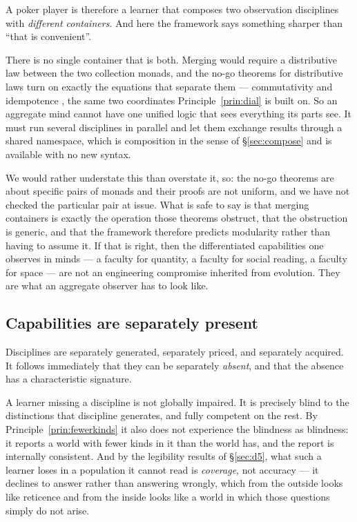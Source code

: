 A poker player is therefore a learner that composes two observation disciplines
with \emph{different containers}. And here the framework says something sharper
than ``that is convenient''.

\begin{observation}
\label{obs:nomerge}
There is no single container that is both. Merging would require a distributive
law between the two collection monads, and the no-go theorems for distributive
laws turn on exactly the equations that separate them --- commutativity and
idempotence \cite{ZwartMarsden19}, the same two coordinates
Principle~\ref{prin:dial} is built on. So an aggregate mind cannot have one
unified logic that sees everything its parts see. It must run several disciplines
in parallel and let them exchange results through a shared namespace, which is
composition in the sense of \S\ref{sec:compose} and is available with no new
syntax.
\end{observation}

We would rather understate this than overstate it, so: the no-go theorems are
about specific pairs of monads and their proofs are not uniform, and we have not
checked the particular pair at issue. What is safe to say is that merging
containers is exactly the operation those theorems obstruct, that the obstruction
is generic, and that the framework therefore predicts modularity rather than
having to assume it. If that is right, then the differentiated capabilities one
observes in minds --- a faculty for quantity, a faculty for social reading, a
faculty for space --- are not an engineering compromise inherited from evolution.
They are what an aggregate observer has to look like.

\subsection{Capabilities are separately present}

Disciplines are separately generated, separately priced, and separately acquired.
It follows immediately that they can be separately \emph{absent}, and that the
absence has a characteristic signature.

A learner missing a discipline is not globally impaired. It is precisely blind to
the distinctions that discipline generates, and fully competent on the rest. By
Principle~\ref{prin:fewerkinds} it also does not experience the blindness as
blindness: it reports a world with fewer kinds in it than the world has, and the
report is internally consistent. And by the legibility results of
\S\ref{sec:d5}, what such a learner loses in a population it cannot read is
\emph{coverage}, not accuracy --- it declines to answer rather than answering
wrongly, which from the outside looks like reticence and from the inside looks
like a world in which those questions simply do not arise.

